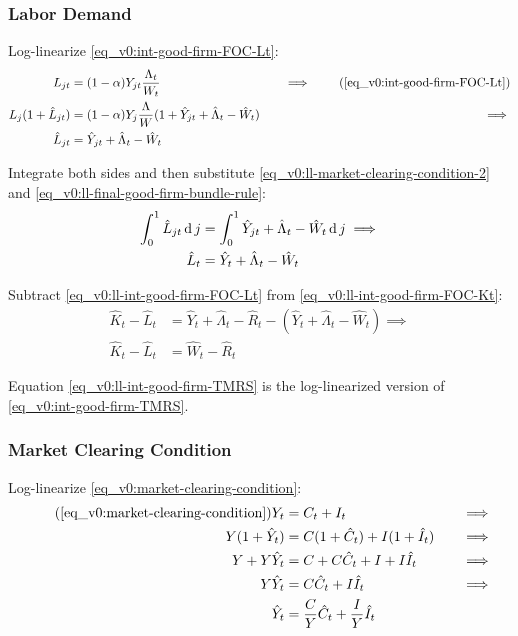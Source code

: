\documentclass[../thesis.tex]{subfiles}
\begin{document}
	
	\subsubsection*{Labor Demand}
	
	Log-linearize \ref{eq_v0:int-good-firm-FOC-Lt}:
	\begin{alignat}{2}
		L_{jt} &= (1-\alpha) Y_{jt} \frac{\Lambda_t}{W_t} &\implies \tag{\ref{eq_v0:int-good-firm-FOC-Lt}} \\
		L_j (1+ \hat{L}_{jt}) &= (1-\alpha) Y_{j} \frac{\Lambda}{W} (1+ \hat{Y}_{jt} +\hat{\Lambda}_t -\hat{W}_t) \quad &\implies \nonumber \\
		\hat{L}_{jt} &= \hat{Y}_{jt} +\hat{\Lambda}_t -\hat{W}_t \nonumber
	\end{alignat}
	
	Integrate both sides and then substitute \ref{eq_v0:ll-market-clearing-condition-2} and \ref{eq_v0:ll-final-good-firm-bundle-rule}:
	\begin{align}
		\int_{0}^{1} \hat{L}_{jt} \operatorname{d} j &= \int_{0}^{1} \hat{Y}_{jt} + \hat{\Lambda}_t - \hat{W}_t \operatorname{d} j \implies \nonumber \\
		\hat{L}_t &= \hat{Y}_t + \hat{\Lambda}_t - \hat{W}_t
		\label{eq_v0:ll-int-good-firm-FOC-Lt}
	\end{align}
	
	Subtract \ref{eq_v0:ll-int-good-firm-FOC-Lt} from \ref{eq_v0:ll-int-good-firm-FOC-Kt}:
	\begin{align}
		\hat{K}_t - \hat{L}_t &= \hat{Y}_t + \hat{\Lambda}_t - \hat{R}_t - (\hat{Y}_t + \hat{\Lambda}_t - \hat{W}_t) \implies \nonumber \\
		\hat{K}_t - \hat{L}_t &= \hat{W}_t - \hat{R}_t \label{eq_v0:ll-int-good-firm-TMRS}
	\end{align}
	
	Equation \ref{eq_v0:ll-int-good-firm-TMRS} is the log-linearized version of \ref{eq_v0:int-good-firm-TMRS}.
	
	
	\subsubsection*{Market Clearing Condition}
	
	Log-linearize \ref{eq_v0:market-clearing-condition}:
	\begin{alignat}{2}
		\tag{\ref{eq_v0:market-clearing-condition}}
		Y_t &= C_t + I_t &\implies \\
		Y (1+ \hat{Y}_t) &= C(1+ \hat{C}_t) + I (1+ \hat{I}_t) \quad &\implies \nonumber \\
		Y + Y\hat{Y}_t &= C + C\hat{C}_t + I + I\hat{I}_t &\implies \nonumber  \\
		Y\hat{Y}_t &= C\hat{C}_t + I\hat{I}_t &\implies \nonumber \\
		\hat{Y}_t &= \frac{C}{Y}\hat{C}_t + \frac{I}{Y}\hat{I}_t  \label{eq_v0:ll-market-clearing-condition}
	\end{alignat}
	
\end{document}
